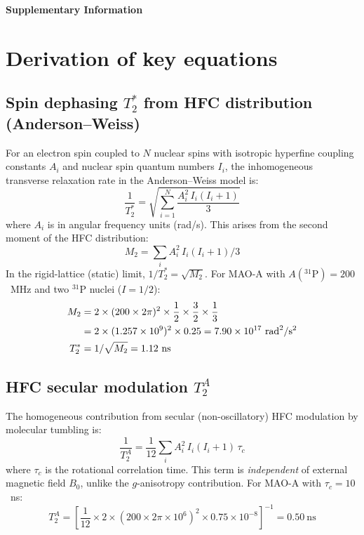 \documentclass[11pt]{article}
\begin{document}
\begin{center}
{\LARGE\bfseries Supplementary Information}
\end{center}
\vspace{1em}



\newpage

\section{Derivation of key equations}

\subsection{Spin dephasing $T_2^*$ from HFC distribution (Anderson--Weiss)}

For an electron spin coupled to $N$ nuclear spins with isotropic hyperfine coupling constants $A_i$ and nuclear spin quantum numbers $I_i$, the inhomogeneous transverse relaxation rate in the Anderson--Weiss model is\cite{Anderson1954}:
\begin{equation}
\frac{1}{T_2^*} = \sqrt{\sum_{i=1}^{N} \frac{A_i^2\, I_i(I_i+1)}{3}}
\label{eq:T2star}
\end{equation}
where $A_i$ is in angular frequency units (rad/s). This arises from the second moment of the HFC distribution:
\begin{equation}
M_2 = \sum_i A_i^2\, I_i(I_i+1)/3
\end{equation}
In the rigid-lattice (static) limit, $1/T_2^* = \sqrt{M_2}$. For MAO-A with $A(^{31}\mathrm{P}) = 200$~MHz and two $^{31}$P nuclei ($I = 1/2$):
\begin{align}
M_2 &= 2 \times (200 \times 2\pi)^2 \times \frac{1}{2}\times\frac{3}{2}\times\frac{1}{3} \notag\\
    &= 2 \times (1.257 \times 10^9)^2 \times 0.25 = 7.90 \times 10^{17}~\mathrm{rad}^2/\mathrm{s}^2 \notag\\
T_2^* &= 1/\sqrt{M_2} = 1.12~\mathrm{ns}
\end{align}

\subsection{HFC secular modulation $T_2^A$}

The homogeneous contribution from secular (non-oscillatory) HFC modulation by molecular tumbling is\cite{Abragam1961}:
\begin{equation}
\frac{1}{T_2^A} = \frac{1}{12}\sum_{i} A_i^2\, I_i(I_i + 1)\,\tau_c
\label{eq:T2A}
\end{equation}
where $\tau_c$ is the rotational correlation time. This term is \emph{independent} of external magnetic field $B_0$, unlike the $g$-anisotropy contribution. For MAO-A with $\tau_c = 10$~ns:
\begin{equation}
T_2^A = \left[\frac{1}{12} \times 2 \times (200 \times 2\pi \times 10^6)^2 \times 0.75 \times 10^{-8}\right]^{-1} = 0.50~\mathrm{ns}
\end{equation}
\end{document}
